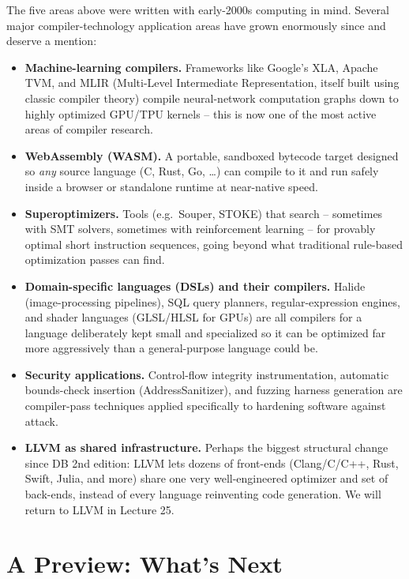 \documentclass[11pt]{article}
\begin{document}
\begin{enrichment}
The five areas above were written with early-2000s computing in mind. Several major
compiler-technology application areas have grown enormously since and deserve a mention:
\begin{itemize}
  \item \textbf{Machine-learning compilers.} Frameworks like Google's XLA, Apache TVM, and
  MLIR (Multi-Level Intermediate Representation, itself built using classic compiler theory)
  compile neural-network computation graphs down to highly optimized GPU/TPU kernels -- this is
  now one of the most active areas of compiler research.
  \item \textbf{WebAssembly (WASM).} A portable, sandboxed bytecode target designed so
  \emph{any} source language (C, Rust, Go, \dots) can compile to it and run safely inside a
  browser or standalone runtime at near-native speed.
  \item \textbf{Superoptimizers.} Tools (e.g.\ Souper, STOKE) that search -- sometimes with
  SMT solvers, sometimes with reinforcement learning -- for provably optimal short instruction
  sequences, going beyond what traditional rule-based optimization passes can find.
  \item \textbf{Domain-specific languages (DSLs) and their compilers.} Halide (image-processing
  pipelines), SQL query planners, regular-expression engines, and shader languages (GLSL/HLSL for
  GPUs) are all compilers for a language deliberately kept small and specialized so it can be
  optimized far more aggressively than a general-purpose language could be.
  \item \textbf{Security applications.} Control-flow integrity instrumentation, automatic
  bounds-check insertion (AddressSanitizer), and fuzzing harness generation are compiler-pass
  techniques applied specifically to hardening software against attack.
  \item \textbf{LLVM as shared infrastructure.} Perhaps the biggest structural change since DB
  2nd edition: LLVM lets dozens of front-ends (Clang/C/C++, Rust, Swift, Julia, and more) share
  one very well-engineered optimizer and set of back-ends, instead of every language reinventing
  code generation. We will return to LLVM in Lecture 25.
\end{itemize}
\end{enrichment}

\section{A Preview: What's Next}
\end{document}
